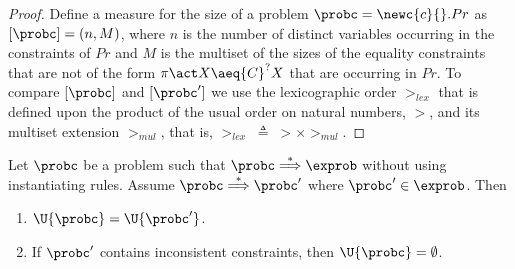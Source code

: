 \termination*

\begin{proof}
 Define a measure for the size of a problem $\probc = \newc{c}{}.Pr$ as $[\probc] = (n,M)$, where $n$ is the number of distinct variables occurring in the constraints of $Pr$ and $M$ is the multiset of the sizes of the equality constraints that are not of the form $\pi\act X\aeq{C}^? X$ that are occurring in $Pr$. To compare $[\probc]$ and $[\probc']$ we use the lexicographic order $>_{lex}$ that is defined upon the product of the usual order on natural numbers, $>$, and its multiset extension $>_{mul}$, that is,  $>_{lex} \; \triangleq \; > \times >_{mul}$. 
\end{proof}

\begin{lemma}\label{alemma:preservation-solution}
     Let $\probc$ be a problem such that $\probc\overset{*}{\Longrightarrow} \exprob$ without using instantiating rules. Assume $\probc \overset{*}{\Longrightarrow} \probc'$ where $\probc'\in \exprob$. Then
     \begin{enumerate}
         \item  $\U{\probc}=\U{\probc'}$. 

         \item If $\probc'$ contains inconsistent constraints, then $\U{\probc} = \emptyset$.
     \end{enumerate}
 \end{lemma}

